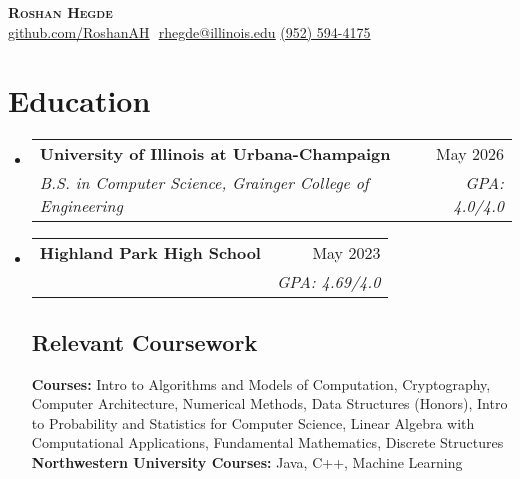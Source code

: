 \documentclass[letterpaper,11pt]{article}
\makeatletter
\newcommand{\resumeSubheading}[4]{
  \vspace{-2pt}\item
    \begin{tabular*}{0.97\textwidth}[t]{l@{\extracolsep{\fill}}r}
      \textbf{#1} & #2 \\
      \textit{\small#3} & \textit{\small #4} \\
    \end{tabular*}\vspace{-7pt}
}
\newcommand{\resumeSubHeadingListStart}{\begin{itemize}[leftmargin=0.15in, label={}]}
\newcommand{\resumeSubHeadingListEnd}{\end{itemize}}
\makeatother
\begin{document}
\vspace{-7pt}

\begin{center}
    \textbf{\Huge \scshape Roshan Hegde} \\ \vspace{8pt}
    \small 
    \href{https://github.com/RoshanAH}{\underline{github.com/RoshanAH}} $  $
    \href{mailto:rhegde@illinois.edu}{\underline{rhegde@illinois.edu}}
    {\underline{(952) 594-4175}}
\end{center}

\section{Education}
  \resumeSubHeadingListStart
  
    \resumeSubheading
      {University of Illinois at Urbana-Champaign}{May 2026}
      {B.S. in Computer Science, Grainger College of Engineering}
      {GPA: 4.0/4.0}
    
    \resumeSubheading
      {Highland Park High School}{May 2023}
      {}{GPA: 4.69/4.0}

    \vspace{-10pt}
    \subsection{Relevant Coursework}
      \textbf{Courses:} 
      Intro to Algorithms and Models of Computation,
      Cryptography,
      Computer Architecture,
      Numerical Methods,
      Data Structures (Honors),
      Intro to Probability and Statistics for Computer Science,
      Linear Algebra with Computational Applications,
      Fundamental Mathematics,
      Discrete Structures
      \\

      \textbf{Northwestern University Courses:} Java, C++, Machine Learning
  \resumeSubHeadingListEnd

\end{document}
